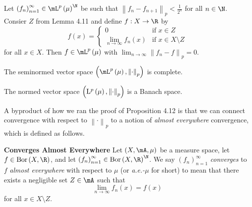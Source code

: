 \documentclass[pmath450]{subfiles}
\begin{document}
    \begin{prop}{}
        Let $\left( f_{n} \right)^{\infty}_{n=1}\in\lp\left( \mu \right)^{\N}$ be such that $\left\lVert f_n-f_{n+1}\right\rVert_p<\frac{1}{2^n}$ for all $n\in\N$. Consier $Z$ from Lemma 4.11 and define $f:X\to\R$ by
        \begin{equation*}
            f\left( x \right) = 
            \begin{cases} 
                0 & \text{if $x\in Z$}\\
                \lim_{n\to\infty} f_n\left( x \right) & \text{if $x\in X\setminus Z$}
            \end{cases}
        \end{equation*}
        for all $x\in X$. Then $f\in\lp\left( \mu \right)$ with $\lim_{n\to\infty}\left\lVert f_n-f\right\rVert_p=0$.
    \end{prop}

    \placeqed[tl;dr]

    \clearpage

    \begin{cor}{}
        The seminormed vector space $\left( \lp\left( \mu \right),\left\lVert \cdot\right\rVert_p \right)$ is complete.
    \end{cor}	

    \rruleline

    \begin{cor}{}
        The normed vector space $\left( \operatorname{L^{\text{$p$}}}\left( \mu \right),\left\lVert \cdot\right\rVert_p \right)$ is a Banach space.
    \end{cor}	
    
    \rruleline
    
    \np A byproduct of how we ran the proof of Proposition 4.12 is that we can connect convergence with respect to $\left\lVert \cdot\right\rVert_p$ to a notion of \textit{almost everywhere} convergence, which is defined as follows.

    \begin{definition}{\textbf{Converges Almost Everywhere}}
        Let $\left( X,\mA,\mu \right)$ be a measure space, let $f\in\bor\left( X,\R \right)$, and let $\left( f_{n} \right)^{\infty}_{n=1}\in\bor\left( X,\R \right)^{\N}$. We say $\left( f_{n} \right)^{\infty}_{n=1}$ \emph{converges} to $f$ \emph{almost everywhere} with respect to $\mu$ (or \emph{a.e.-$\mu$} for short) to mean that there exists a negligible set $Z\in\mA$ such that
        \begin{equation*}
            \lim_{n\to\infty}f_n\left( x \right)=f\left( x \right)
        \end{equation*}
        for all $x\in X\setminus Z$.
    \end{definition}
    
\end{document}

